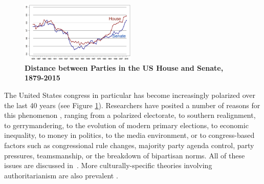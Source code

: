 \begin{figure}[htbp]
\begin{center}
\includegraphics[width=0.49\textwidth]{figs/polar_house_and_senate_46-115_july_11}
\caption{{\bf Distance between Parties in the US House and Senate, 1879-2015}}
\label{fig:uscongress}
\end{center}
\end{figure}

The United States congress in particular has become increasingly polarized over the last 40 years (see Figure \ref{fig:uscongress}).  
Researchers have posited a number of reasons for this phenomenon \cite{barber2015causes}\cite{poole1984polarization}, ranging from a polarized electorate, to southern realignment, to gerrymandering, to the evolution of modern primary elections, to economic inequality, to money in politics, to the media environment, or to congress-based factors such as congressional rule changes, majority party agenda control, party pressures, teamsmanship, or the breakdown of bipartisan norms.  All of these issues are discussed in~\cite{poole1984polarization}.
More culturally-specific theories involving authoritarianism are also prevalent \cite{hetherington2009authoritarianism}.






